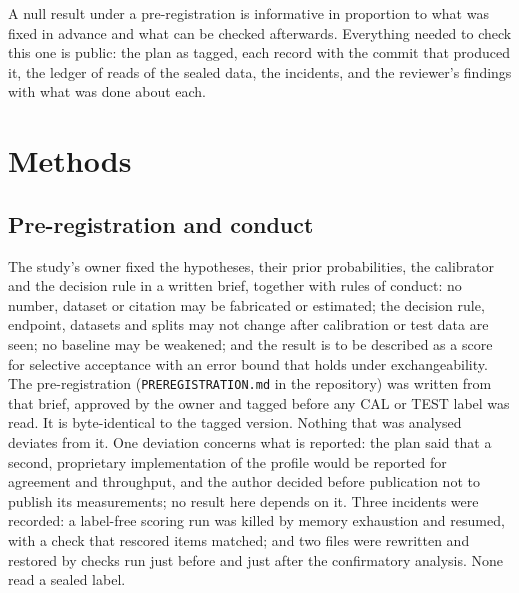 \documentclass[11pt]{article}
\begin{document}
A null result under a pre-registration is informative in proportion to what was fixed in advance and what can be checked afterwards. Everything needed to check this one is public: the plan as tagged, each record with the commit that produced it, the ledger of reads of the sealed data, the incidents, and the reviewer's findings with what was done about each.

\section*{Methods}

\subsection*{Pre-registration and conduct}
The study's owner fixed the hypotheses, their prior probabilities, the calibrator and the decision rule in a written brief, together with rules of conduct: no number, dataset or citation may be fabricated or estimated; the decision rule, endpoint, datasets and splits may not change after calibration or test data are seen; no baseline may be weakened; and the result is to be described as a score for selective acceptance with an error bound that holds under exchangeability. The pre-registration (\texttt{PREREGISTRATION.md} in the repository) was written from that brief, approved by the owner and tagged before any CAL or TEST label was read. It is byte-identical to the tagged version. Nothing that was analysed deviates from it. One deviation concerns what is reported: the plan said that a second, proprietary implementation of the profile would be reported for agreement and throughput, and the author decided before publication not to publish its measurements; no result here depends on it. Three incidents were recorded: a label-free scoring run was killed by memory exhaustion and resumed, with a check that rescored items matched; and two files were rewritten and restored by checks run just before and just after the confirmatory analysis. None read a sealed label.
\end{document}
